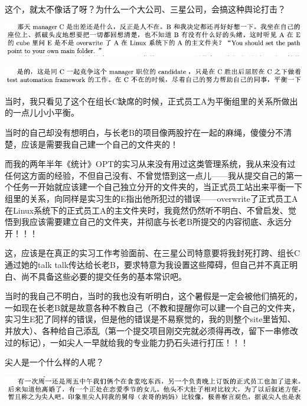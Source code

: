 \documentclass[9pt, b5paper]{article}
\begin{document}
这个，就太不像话了呀？为什么一个大公司、三星公司，会搞这种舆论打击？

\begin{center}
\includegraphics[width=.9\linewidth]{./pic/backups_plans_20210507_094121.png}
\end{center}

\begin{center}
\includegraphics[width=.9\linewidth]{./pic/backups_plans_20210507_094251.png}
\end{center}

当时，我只看见了这个在组长C缺席的时候，正式员工A为平衡组里的关系所做出的一点儿小小平衡。

当时的自己却没有想明白，与长老B的项目像两股拧在一起的麻绳，傻傻分不清楚，应该是需要我自己建一个自己的文件夹的！

而我的两年半年《统计》OPT的实习从来没有用过这类管理系统，我从来没有过任何这方面的经验，不但自己没有、不曾觉悟到这一点儿——我从提交自己的第一个任务一开始就应该建一个自己独立分开的文件夹的，当正式员工站出来平衡一下组里的关系，向同样是实习生的E指出他所犯过的错误——overwrite了正式员工A在Linux系统下的正式员工A的主文件夹时，我竟然仍然听不明白、不曾启发、觉悟到我应该需要建立自己的文件夹，并彻底与长老B所提交的内容彻底、永远分开！！！

这，应该是在真正的实习工作考验面前、在三星公司特意要将我封死打跨、组长C通过她的talk talk传达给长老B，要求特意为我设置这些障碍，但自己并不真正明白、尚不具备这些必要的提交任务的基本常识吧。 

当时的我自己不明白，当时的我也没有听明白，这个暑假是一定会被他们搞死的，一如现在长老B就是故意各种不教自己（不教和提醒你可以建一个自己的文件夹，实习生E犯了同样的错误，但是他的错误是不易察觉的，我的则整个site里皆知、并放大）、各种给自己添乱（第一个提交项目刚交完就必须得再改，留下一串修改过的标记），一如尖人一早就给我的专业能力扔石头进行打压！！！

尖人是一个什么样的人呢？

\begin{center}
\includegraphics[width=.9\linewidth]{./pic/backups_plans_20210507_103838.png}
\end{center}
\end{document}
